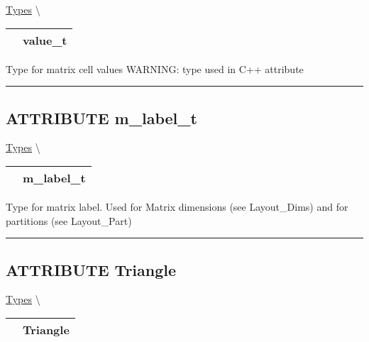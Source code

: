 \hypertarget{ecldoc:pbblas.types.value_t}{}
\hspace{0pt} \hyperlink{ecldoc:PBblas.Types}{Types} \textbackslash 

{\renewcommand{\arraystretch}{1.5}
\begin{tabularx}{\textwidth}{|>{\raggedright\arraybackslash}l|X|}
\hline
\hspace{0pt}\mytexttt{\color{red} } & \textbf{value\_t} \\
\hline
\end{tabularx}
}

\par
Type for matrix cell values WARNING: type used in C++ attribute


\rule{\linewidth}{0.5pt}
\subsection*{\textsf{\colorbox{headtoc}{\color{white} ATTRIBUTE}
m\_label\_t}}

\hypertarget{ecldoc:pbblas.types.m_label_t}{}
\hspace{0pt} \hyperlink{ecldoc:PBblas.Types}{Types} \textbackslash 

{\renewcommand{\arraystretch}{1.5}
\begin{tabularx}{\textwidth}{|>{\raggedright\arraybackslash}l|X|}
\hline
\hspace{0pt}\mytexttt{\color{red} } & \textbf{m\_label\_t} \\
\hline
\end{tabularx}
}

\par
Type for matrix label. Used for Matrix dimensions (see Layout\_Dims) and for partitions (see Layout\_Part)


\rule{\linewidth}{0.5pt}
\subsection*{\textsf{\colorbox{headtoc}{\color{white} ATTRIBUTE}
Triangle}}

\hypertarget{ecldoc:ecldoc-Triangle}{}
\hspace{0pt} \hyperlink{ecldoc:PBblas.Types}{Types} \textbackslash 

{\renewcommand{\arraystretch}{1.5}
\begin{tabularx}{\textwidth}{|>{\raggedright\arraybackslash}l|X|}
\hline
\hspace{0pt}\mytexttt{\color{red} } & \textbf{Triangle} \\
\hline
\end{tabularx}
}

